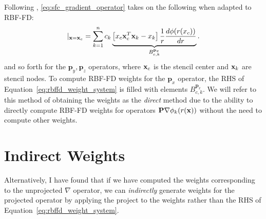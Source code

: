 Following \cite{FlyerLehto11}, \ref{eq:sfc_gradient_operator} takes on the following when adapted to RBF-FD:  
\begin{equation}
[ \mathbf{p}_{x} \cdot \nabla{f(\vx)}] |_{\vx = \vx_{c}} = \sum_{k=1}^{n} c_{k} \underbrace{\left[ x_{c} \vx_{c}^{T} \vx_{k} - x_{k} \right] \frac{1}{r} \d{\phi(r(x_{c}))}{r}}_{B_{c,k}^{\mathbf{p}_{x}}}. 
\label{eq:xsfc_operator_flyer_et_al}
\end{equation}
and so forth for the $\mathbf{p}_{y}, \mathbf{p}_{z}$ operators, where $\mathbf{x}_{c}$ is the stencil center and $\mathbf{x}_{k}$ are stencil nodes. To compute RBF-FD weights for the $\mathbf{p}_{x}$ operator, the RHS of Equation~\ref{eq:rbffd_weight_system} is filled with elements $B_{c,k}^{\mathbf{p}_{x}}$. We will refer to this method of obtaining the weights as the \emph{direct} method due to the ability to directly compute RBF-FD weights for operators $\mathbf{P} \nabla \phi_{k}(r(\mathbf{x}))$ without the need to compute other weights.

\section{Indirect Weights} 

Alternatively, I have found that if we have computed the weights corresponding to the unprojected $\nabla$ operator, we can \emph{indirectly} generate weights for the projected operator by applying the project to the weights rather than the RHS of Equation~\ref{eq:rbffd_weight_system}. 



